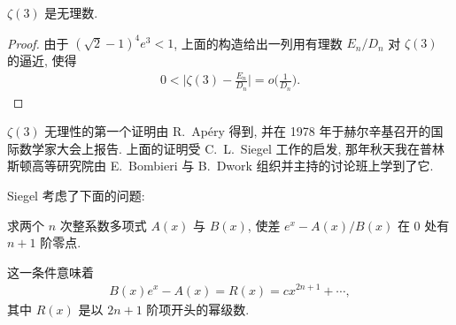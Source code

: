 \begin{theorem}\label{thm:1.4}
$\zeta(3)$ 是无理数.
\end{theorem}

\begin{proof}
由于 $(\sqrt{2}-1)^4 e^3 < 1$, 上面的构造给出一列用有理数 $E_n/D_n$ 对 $\zeta(3)$ 的逼近, 使得
\begin{align*}
  0<\Big|\zeta(3)-\frac{E_{n}}{D_{n}}\Big|=o\Big(\frac{1}{D_{n}}\Big).
\end{align*}
\end{proof}

$\zeta(3)$ 无理性的第一个证明由 R.~Apéry \cite{b18} 得到, 并在 1978 年于赫尔辛基召开的国际数学家大会上报告. 上面的证明受 C.~L.~Siegel 工作的启发, 那年秋天我在普林斯顿高等研究院由 E.~Bombieri 与 B.~Dwork 组织并主持的讨论班上学到了它.

Siegel \cite{b39} 考虑了下面的问题:

求两个 $n$ 次整系数多项式 $A(x)$ 与 $B(x)$, 使差 $e^x - A(x)/B(x)$ 在 $0$ 处有 $n + 1$ 阶零点.

这一条件意味着
\begin{align*}
  B(x)e^{x}-A(x)=R(x)=cx^{2n+1}+\cdots,
\end{align*}
其中 $R(x)$ 是以 $2n+1$ 阶项开头的幂级数.

